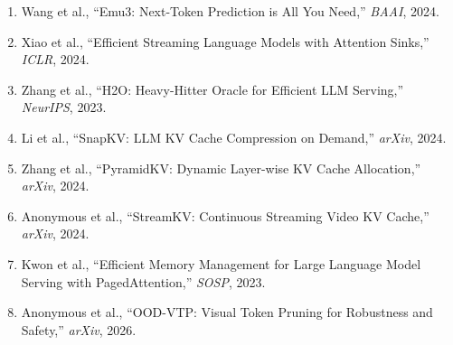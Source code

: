 \documentclass[10pt, a4paper, twocolumn]{article}
\begin{document}
\begin{enumerate}
    \item Wang et al., ``Emu3: Next-Token Prediction is All You Need,'' \textit{BAAI}, 2024.
    \item Xiao et al., ``Efficient Streaming Language Models with Attention Sinks,'' \textit{ICLR}, 2024.
    \item Zhang et al., ``H2O: Heavy-Hitter Oracle for Efficient LLM Serving,'' \textit{NeurIPS}, 2023.
    \item Li et al., ``SnapKV: LLM KV Cache Compression on Demand,'' \textit{arXiv}, 2024.
    \item Zhang et al., ``PyramidKV: Dynamic Layer-wise KV Cache Allocation,'' \textit{arXiv}, 2024.
    \item Anonymous et al., ``StreamKV: Continuous Streaming Video KV Cache,'' \textit{arXiv}, 2024.
    \item Kwon et al., ``Efficient Memory Management for Large Language Model Serving with PagedAttention,'' \textit{SOSP}, 2023.
    \item Anonymous et al., ``OOD-VTP: Visual Token Pruning for Robustness and Safety,'' \textit{arXiv}, 2026.
\end{enumerate}
\end{document}

